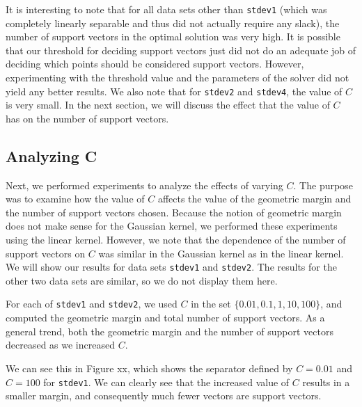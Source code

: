 \documentclass{sigchi}
\begin{document}
It is interesting to note that for all data sets other than \texttt{stdev1} (which was completely linearly separable and thus did not actually require any slack), the number of support vectors in the optimal solution was very high. It is possible that our threshold for deciding support vectors just did not do an adequate job of deciding which points should be considered support vectors. However, experimenting with the threshold value and the parameters of the solver did not yield any better results. We also note that for \texttt{stdev2} and \texttt{stdev4}, the value of $C$ is very small. In the next section, we will discuss the effect that the value of $C$ has on the number of support vectors.

\subsection{Analyzing C}

Next, we performed experiments to analyze the effects of varying $C$. The purpose was to examine how the value of $C$ affects the value of the geometric margin and the number of support vectors chosen. Because the notion of geometric margin does not make sense for the Gaussian kernel, we performed these experiments using the linear kernel. However, we note that the dependence of the number of support vectors on $C$ was similar in the Gaussian kernel as in the linear kernel. We will show our results for data sets \texttt{stdev1} and \texttt{stdev2}. The results for the other two data sets are similar, so we do not display them here.

For each of \texttt{stdev1} and \texttt{stdev2}, we used $C$ in the set $\{0.01, 0.1, 1, 10, 100\}$, and computed the geometric margin and total number of support vectors. As a general trend, both the geometric margin and the number of support vectors decreased as we increased $C$. %

We can see this in Figure xx, which shows the separator defined by $C = 0.01$ and $C = 100$ for \texttt{stdev1}. We can clearly see that the increased value of $C$ results in a smaller margin, and consequently much fewer vectors are support vectors.
\end{document}
